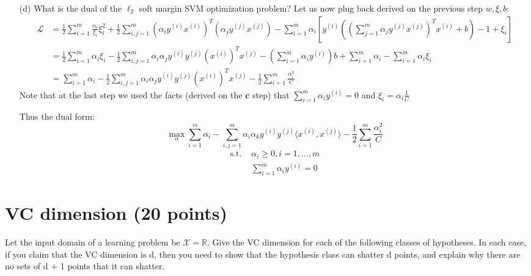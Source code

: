 \documentclass{article}
\newcommand{\ith}{^{(i)}}
\newcommand{\jth}{^{(j)}}
\begin{document}
\begin{itemize}
	
	
	\item[(d)] What is the dual of the $\ell_2$ soft margin SVM optimization problem?
	Let us now plug back derived on the previous step $w, \xi, b$:
	\begin{align*}
	\mathcal{L} &= \frac{1}{2} \sum_{i=1}^{m} \frac{\alpha_i }{\xi_i} \xi_i^2
	+  \frac{1}{2} \sum_{i,j=1}^{m} (\alpha_i y\ith x\ith)^T (\alpha_j y\jth x\jth)
	- \sum_{i=1}^{m} \alpha_i [y\ith((\sum_{j=1}^{m}\alpha_j y\jth x\jth)^T x\ith + b) - 1 + \xi_i]\\	
	&= \frac{1}{2} \sum_{i=1}^{m} \alpha_i \xi_i
	-  \frac{1}{2} \sum_{i,j=1}^{m} \alpha_i \alpha_j y\ith y\jth (x\ith)^T x\jth
	- (\sum_{i=1}^{m} \alpha_i y\ith)b
	+ \sum_{i=1}^{m} \alpha_i
	- \sum_{i=1}^{m} \alpha_i \xi_i \\
	&= \sum_{i=1}^{m} \alpha_i 
	- \frac{1}{2} \sum_{i,j=1}^{m} \alpha_i \alpha_j y\ith y\jth (x\ith)^T x\jth
	- \frac{1}{2} \sum_{i=1}^{m} \frac{\alpha_i^2}{C}
	\end{align*}
	Note that at the last step we used the facts (derived on the \textbf{c} step) that $\sum_{i=1}^{m} \alpha_i y\ith = 0 $ and $\xi_i = \alpha_i \frac{1}{C} $
		
	Thus the dual form:
	$$\max_\alpha \sum_{i=1}^{m} \alpha_i 
	- \sum_{i,j=1}^{m} \alpha_i \alpha_k y\ith y\jth \langle x\ith, x\jth\rangle 
	- \frac{1}{2} \sum_{i=1}^{m} \frac{\alpha_i^2}{C}$$
	\begin{align*}
	\text{s.t. } &\alpha_i \ge 0, i = 1,...,m\\
	& \sum_{i=1}^{m} \alpha_i y\ith = 0 
	\end{align*}
\end{itemize}



\pagebreak
\section{VC dimension (20 points)}
Let the input domain of a learning problem be $\mathcal{X} = \mathbb{R}$. Give the VC dimension for each of the following classes of hypotheses. In each case, if you claim that the VC dimension is d, then you need to show that the hypothesis class can shatter d points, and explain why there are no sets of d + 1 points that it can shatter.
\end{document}
